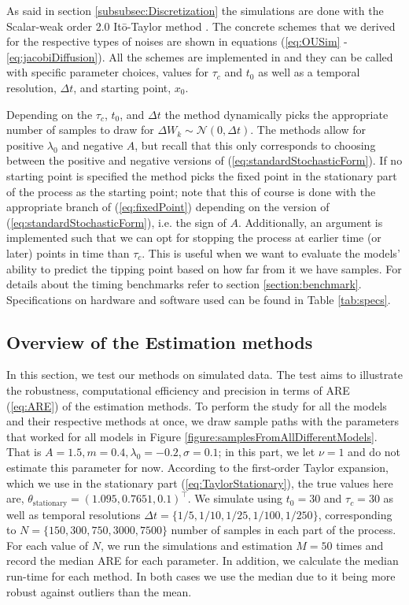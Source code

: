 As said in section \ref{subsubsec:Discretization} the simulations are done with the Scalar-weak order 2.0 Itō-Taylor method \cite[algorithm 8.5]{Srkk2019}. The concrete schemes that we derived for the respective types of noises are shown in equations (\ref{eq:OUSim} - \ref{eq:jacobiDiffusion}). All the schemes are implemented in  and they can be called with specific parameter choices, values for $\tau_c$ and $t_0$ as well as a temporal resolution, $\Delta t$,  and starting point, $x_0$. 

Depending on the $\tau_c$, $t_0$, and $\Delta t$ the method dynamically picks the appropriate number of samples to draw for $\Delta W_k\sim\mathcal{N}\left(0,\Delta t\right)$. The methods allow for positive $\lambda_0$ and negative $A$, but recall that this only corresponds to choosing between the positive and negative versions of (\ref{eq:standardStochasticForm}). If no starting point is specified the method picks the fixed point in the stationary part of the process as the starting point; note that this of course is done with the appropriate branch of (\ref{eq:fixedPoint}) depending on the version of (\ref{eq:standardStochasticForm}), i.e. the sign of $A$. Additionally, an argument is implemented such that we can opt for stopping the process at earlier time (or later) points in time than $\tau_c$. This is useful when we want to evaluate the models' ability to predict the tipping point based on how far from it we have samples. For details about the timing benchmarks refer to section \ref{section:benchmark}. Specifications on hardware and software used can be found in Table \ref{tab:specs}. 
\subsection{Overview of the Estimation methods}
In this section, we test our methods on simulated data. The test aims to illustrate the robustness, computational efficiency and precision in terms of ARE (\ref{eq:ARE}) of the estimation methods. To perform the study for all the models and their respective methods at once, we draw sample paths with the parameters that worked for all models in Figure \ref{figure:samplesFromAllDifferentModels}. That is $A = 1.5, m = 0.4, \lambda_0 = -0.2, \sigma = 0.1$; in this part, we let $\nu = 1$ and do not estimate this parameter for now. According to the first-order Taylor expansion, which we use in the stationary part (\ref{eq:TaylorStationary}), the true values here are, $\theta_{\mathrm{stationary}} = (1.095, 0.7651, 0.1)^\top$. We simulate using $t_0 = 30$ and $\tau_c = 30$ as well as temporal resolutions $\Delta t = \{1/5, 1/10, 1/25, 1/100, 1/250\}$, corresponding to $N = \{150, 300, 750, 3000, 7500\}$ number of samples in each part of the process. For each value of $N$, we run the simulations and estimation $M = 50$ times and record the median ARE for each parameter. In addition, we calculate the median run-time for each method. In both cases we use the median due to it being more robust against outliers than the mean.

